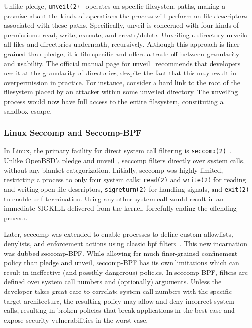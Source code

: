 Unlike pledge, \texttt{unveil(2)}~\cite{unveil, corbet2018_unveil} operates on specific
filesystem paths, making a promise about the kinds of operations the process will perform
on file descriptors associated with these paths. Specifically, unveil is concerned with
four kinds of permissions: read, write, execute, and create/delete. Unveiling a directory
unveils all files and directories underneath, recursively. Although this approach is
finer-grained than pledge, it is file-specific and offers a trade-off between granularity
and usability. The official manual page for unveil~\cite{unveil} recommends that
developers use it at the granularity of directories, despite the fact that this may result
in overpermission in practice. For instance, consider a hard link to the root of the
filesystem placed by an attacker within some unveiled directory. The unveiling process
would now have full access to the entire filesystem, constituting a sandbox escape.

\subsubsection*{Linux Seccomp and Seccomp-BPF}%
\label{sss:seccomp}

In Linux, the primary facility for direct system call filtering is
\texttt{seccomp(2)}~\cite{anderson2017_comparison, seccomp, prctl, edge2015_seccomp}.
Unlike OpenBSD's pledge and unveil~\cite{pledge, unveil}, seccomp filters directly over
system calls, without any blanket categorization. Initially, seccomp was highly limited,
restricting a process to only four system calls: \texttt{read(2)} and \texttt{write(2)}
for reading and writing open file descriptors, \texttt{sigreturn(2)} for handling signals,
and \texttt{exit(2)} to enable self-termination. Using any other system call would result
in an immediate SIGKILL delivered from the kernel, forcefully ending the offending
process.

Later, seccomp was extended to enable processes to define custom allowlists, denylists,
and enforcement actions using classic \gls{bpf} filters~\cite{edge2015_seccomp}. This new
incarnation was dubbed seccomp-BPF. While allowing for much finer-grained confinement
policy than pledge and unveil, seccomp-BPF has its own limitations which can result in
ineffective (and possibly dangerous) policies. In seccomp-BPF, filters are defined over
system call numbers and (optionally) arguments. Unless the developer takes great care to
correlate system call numbers with the specific target architecture, the resulting policy
may allow and deny incorrect system calls, resulting in broken policies that break
applications in the best case and expose security vulnerabilities in the worst case.

